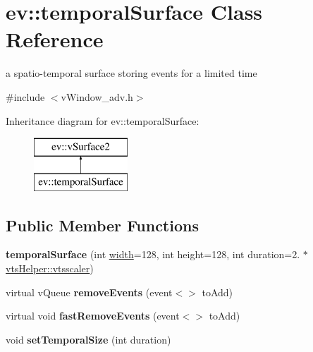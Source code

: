 \hypertarget{classev_1_1temporalSurface}{}\section{ev\+:\+:temporal\+Surface Class Reference}
\label{classev_1_1temporalSurface}


a spatio-\/temporal surface storing events for a limited time  




{\ttfamily \#include $<$v\+Window\+\_\+adv.\+h$>$}

Inheritance diagram for ev\+:\+:temporal\+Surface\+:\begin{figure}[H]
\begin{center}
\leavevmode
\includegraphics[height=2.000000cm]{classev_1_1temporalSurface}
\end{center}
\end{figure}
\subsection*{Public Member Functions}
\begin{DoxyCompactItemize}
\item 
\mbox{\label{classev_1_1temporalSurface_a5fe8e1a5c4011ab466a42855e286d3c8}} 
{\bfseries temporal\+Surface} (int \hyperlink{classev_1_1vSurface2_a1aa8027816352a15d5b9bf1f26f48e76}{width}=128, int height=128, int duration=2. $\ast$\hyperlink{classev_1_1vtsHelper_afa2dd46ae7113668bc6ebea88ab8fa11}{vts\+Helper\+::vtsscaler})
\item 
\mbox{\label{classev_1_1temporalSurface_a358c548e6727aa89d908e61ad948b1ca}} 
virtual v\+Queue {\bfseries remove\+Events} (event$<$$>$ to\+Add)
\item 
\mbox{\label{classev_1_1temporalSurface_a78a9bb93145915a90a5105bab812bb65}} 
virtual void {\bfseries fast\+Remove\+Events} (event$<$$>$ to\+Add)
\item 
\mbox{\label{classev_1_1temporalSurface_a35d4b67c18393961fa833d330a040e80}} 
void {\bfseries set\+Temporal\+Size} (int duration)
\end{DoxyCompactItemize}
